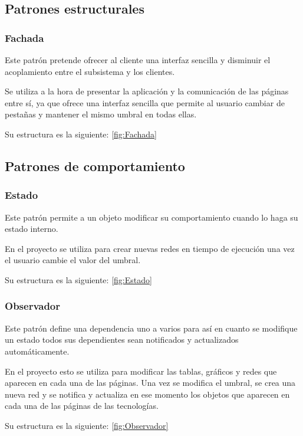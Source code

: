 \subsection{Patrones estructurales}

\subsubsection{Fachada}
Este patrón pretende ofrecer al cliente una interfaz sencilla y disminuir el acoplamiento entre el subsistema y los clientes.

Se utiliza a la hora de presentar la aplicación y la comunicación de las páginas entre sí, ya que ofrece una interfaz sencilla que permite al usuario cambiar de pestañas y mantener el mismo umbral en todas ellas.

Su estructura es la siguiente: \ref{fig:Fachada}


\subsection{Patrones de comportamiento}
\subsubsection{Estado}
Este patrón permite a un objeto modificar su comportamiento cuando lo haga su estado interno.

En el proyecto se utiliza para crear nuevas redes en tiempo de ejecución una vez el usuario cambie el valor del umbral.

Su estructura es la siguiente: \ref{fig:Estado}


\subsubsection{Observador}
Este patrón define una dependencia uno a varios para así en cuanto se modifique un estado todos sus dependientes sean notificados y actualizados automáticamente.

En el proyecto esto se utiliza para modificar las tablas, gráficos y redes que aparecen en cada una de las páginas. Una vez se modifica el umbral, se crea una nueva red y se notifica y actualiza en ese momento los objetos que aparecen en cada una de las páginas de las tecnologías. 

Su estructura es la siguiente: \ref{fig:Observador}

